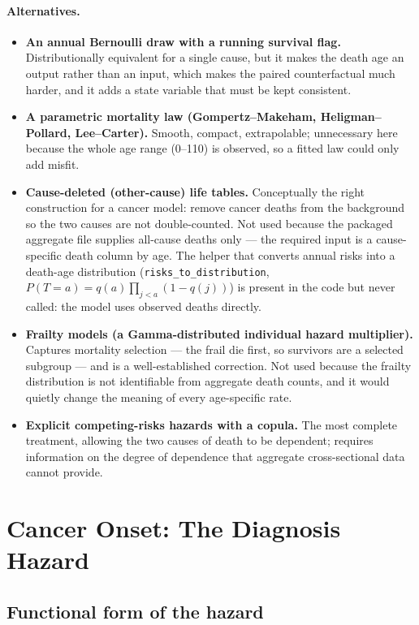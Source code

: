 \documentclass[12pt,a4paper]{article}
\newcommand{\id}[1]{\texttt{#1}}
\newcommand{\alt}[1]{\paragraph{Alternatives.} #1}
\begin{document}
\alt{\begin{itemize}[nosep]
  \item \textbf{An annual Bernoulli draw with a running survival flag.} Distributionally equivalent for a
        single cause, but it makes the death age an output rather than an input, which makes the paired
        counterfactual much harder, and it adds a state variable that must be kept consistent.
  \item \textbf{A parametric mortality law (Gompertz--Makeham, Heligman--Pollard, Lee--Carter).} Smooth,
        compact, extrapolable; unnecessary here because the whole age range (0--110) is observed, so a
        fitted law could only add misfit.
  \item \textbf{Cause-deleted (other-cause) life tables.} Conceptually the right construction for a cancer
        model: remove cancer deaths from the background so the two causes are not double-counted. Not used
        because the packaged aggregate file supplies all-cause deaths only --- the required input is a
        cause-specific death column by age. The helper that converts annual risks into a death-age
        distribution (\id{risks\_to\_distribution}, $P(T=a)=q(a)\prod_{j<a}(1-q(j))$) is present in the
        code but never called: the model uses observed deaths directly.
  \item \textbf{Frailty models (a Gamma-distributed individual hazard multiplier).} Captures mortality
        selection --- the frail die first, so survivors are a selected subgroup --- and is a
        well-established correction. Not used because the frailty distribution is not identifiable from
        aggregate death counts, and it would quietly change the meaning of every age-specific rate.
  \item \textbf{Explicit competing-risks hazards with a copula.} The most complete treatment, allowing the
        two causes of death to be dependent; requires information on the degree of dependence that
        aggregate cross-sectional data cannot provide.
\end{itemize}}

\section{Cancer Onset: The Diagnosis Hazard}

\subsection{Functional form of the hazard}
\end{document}
